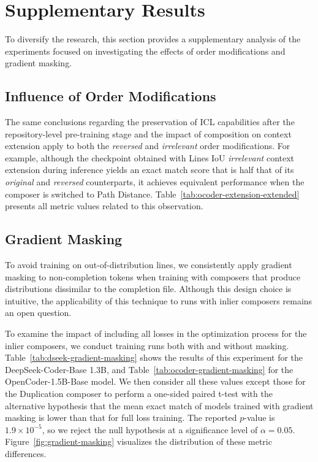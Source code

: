 \section{Supplementary Results}

To diversify the research, this section provides a supplementary analysis of the experiments focused on investigating the effects of order modifications and gradient masking.

\subsection{Influence of Order Modifications}

The same conclusions regarding the preservation of ICL capabilities after the repository-level pre-training stage and the impact of composition on context extension apply to both the \textit{reversed} and \textit{irrelevant} order modifications. For example, although the checkpoint obtained with Lines IoU \textit{irrelevant} context extension during inference yields an exact match score that is half that of its \textit{original} and \textit{reversed} counterparts, it achieves equivalent performance when the composer is switched to Path Distance. Table~\ref{tab:ocoder-extension-extended} presents all metric values related to this observation.

\subsection{Gradient Masking}

To avoid training on out-of-distribution lines, we consistently apply gradient masking to non-completion tokens when training with composers that produce distributions dissimilar to the completion file. Although this design choice is intuitive, the applicability of this technique to runs with inlier composers remains an open question.

To examine the impact of including all losses in the optimization process for the inlier composers, we conduct training runs both with and without masking. Table~\ref{tab:dseek-gradient-masking} shows the results of this experiment for the DeepSeek-Coder-Base 1.3B, and Table~\ref{tab:ocoder-gradient-masking} for the OpenCoder-1.5B-Base model. We then consider all these values except those for the Duplication composer to perform a one-sided paired t-test with the alternative hypothesis that the mean exact match of models trained with gradient masking is lower than that for full loss training. The reported \(p\)-value is \(1.9 \times 10^{-5}\), so we reject the null hypothesis at a significance level of \(\alpha = 0.05\). Figure~\ref{fig:gradient-masking} visualizes the distribution of these metric differences.

